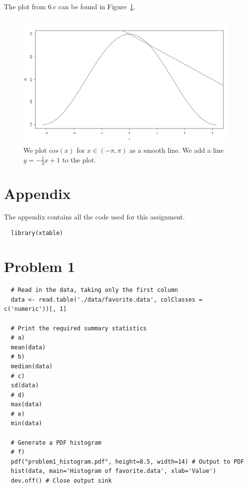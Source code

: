 \documentclass{amsart}
\begin{document}
\newpage
The plot from 6.c can be found in Figure~\ref{fig:6_c}.
\begin{figure}[H]
  \centering
  \includegraphics[width=\textwidth]{problem_6_c.pdf}
  \caption{We plot $cos(x)$ for $x \in (-\pi, \pi)$ as
    a smooth line. We add a line $y = -\frac{1}{3}x+1$ to
    the plot.}
  \label{fig:6_c}
\end{figure}

\section{Appendix}
The appendix contains all the code used for this assignment.

\begin{verbatim}
  library(xtable)

\end{verbatim}
\section*{Problem 1}
\begin{verbatim}
  # Read in the data, taking only the first column
  data <- read.table('./data/favorite.data', colClasses = c('numeric'))[, 1]

  # Print the required summary statistics
  # a)
  mean(data)
  # b)
  median(data)
  # c)
  sd(data)
  # d)
  max(data)
  # e)
  min(data)

  # Generate a PDF histogram
  # f)
  pdf("problem1_histogram.pdf", height=8.5, width=14) # Output to PDF
  hist(data, main='Histogram of favorite.data', xlab='Value')
  dev.off() # Close output sink

\end{verbatim}
\end{document}
